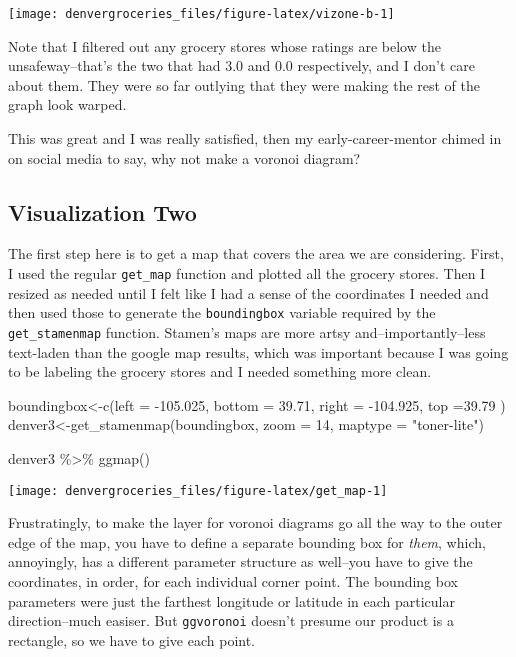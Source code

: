 \documentclass[]{tufte-handout}
\newenvironment{Shaded}{}{}
\newcommand{\AttributeTok}[1]{\textcolor[rgb]{0.49,0.56,0.16}{#1}}
\newcommand{\DecValTok}[1]{\textcolor[rgb]{0.25,0.63,0.44}{#1}}
\newcommand{\FloatTok}[1]{\textcolor[rgb]{0.25,0.63,0.44}{#1}}
\newcommand{\FunctionTok}[1]{\textcolor[rgb]{0.02,0.16,0.49}{#1}}
\newcommand{\NormalTok}[1]{#1}
\newcommand{\OtherTok}[1]{\textcolor[rgb]{0.00,0.44,0.13}{#1}}
\newcommand{\SpecialCharTok}[1]{\textcolor[rgb]{0.25,0.44,0.63}{#1}}
\newcommand{\StringTok}[1]{\textcolor[rgb]{0.25,0.44,0.63}{#1}}
\begin{document}
\texttt{[image: denvergroceries\_files/figure-latex/vizone-b-1]}

Note that I filtered out any grocery stores whose ratings are below the
unsafeway--that's the two that had 3.0 and 0.0 respectively, and I don't
care about them. They were so far outlying that they were making the
rest of the graph look warped.

This was great and I was really satisfied, then my early-career-mentor
chimed in on social media to say, why not make a voronoi diagram?

\hypertarget{visualization-two}{%
\subsection{Visualization Two}\label{visualization-two}}

The first step here is to get a map that covers the area we are
considering. First, I used the regular \texttt{get\_map} function and
plotted all the grocery stores. Then I resized as needed until I felt
like I had a sense of the coordinates I needed and then used those to
generate the \texttt{boundingbox} variable required by the
\texttt{get\_stamenmap} function. Stamen's maps are more artsy
and--importantly--less text-laden than the google map results, which was
important because I was going to be labeling the grocery stores and I
needed something more clean.

\begin{Shaded}
\begin{Highlighting}[]
\NormalTok{boundingbox}\OtherTok{\textless{}{-}}\FunctionTok{c}\NormalTok{(}\AttributeTok{left =} \SpecialCharTok{{-}}\FloatTok{105.025}\NormalTok{, }\AttributeTok{bottom =} \FloatTok{39.71}\NormalTok{, }\AttributeTok{right =}  \SpecialCharTok{{-}}\FloatTok{104.925}\NormalTok{, }\AttributeTok{top =}\FloatTok{39.79}\NormalTok{ )}
\NormalTok{denver3}\OtherTok{\textless{}{-}}\FunctionTok{get\_stamenmap}\NormalTok{(boundingbox, }\AttributeTok{zoom =} \DecValTok{14}\NormalTok{, }\AttributeTok{maptype =} \StringTok{"toner{-}lite"}\NormalTok{)}

\NormalTok{denver3 }\SpecialCharTok{\%\textgreater{}\%} \FunctionTok{ggmap}\NormalTok{()}
\end{Highlighting}
\end{Shaded}

\texttt{[image: denvergroceries\_files/figure-latex/get\_map-1]}

Frustratingly, to make the layer for voronoi diagrams go all the way to
the outer edge of the map, you have to define a separate bounding box
for \emph{them}, which, annoyingly, has a different parameter structure
as well--you have to give the coordinates, in order, for each individual
corner point. The bounding box parameters were just the farthest
longitude or latitude in each particular direction--much easiser. But
\texttt{ggvoronoi} doesn't presume our product is a rectangle, so we
have to give each point.
\end{document}
